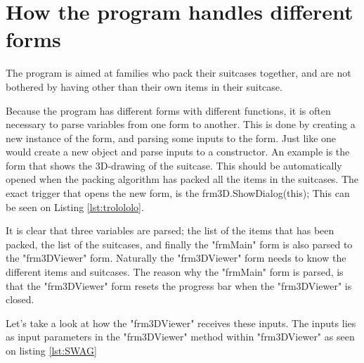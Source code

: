 \section{How the program handles different forms}
The program is aimed at families who pack their suitcases together, and are not bothered by having other than their own items in their suitcase. 

Because the program has different forms with different functions, it is often necessary to parse variables from one form to another. This is done by creating a new instance of the form, and parsing some inputs to the form. Just like one would create a new object and parse inputs to a constructor. An example is the form that shows the 3D-drawing of the suitcase. This should be automatically opened when the packing algorithm has packed all the items in the suitcases. The exact trigger that opens the new form, is the frm3D.ShowDialog(this); This can be seen on Listing \ref{lst:trolololo}. 


It is clear that three variables are parsed; the list of the items that has been packed, the list of the suitcases, and finally the "frmMain" form is also parsed to the "frm3DViewer" form. Naturally the "frm3DViewer" form needs to know the different items and suitcases. The reason why the "frmMain" form is parsed, is that the "frm3DViewer" form resets the progress bar when the "frm3DViewer" is closed. 

Let's take a look at how the "frm3DViewer" receives these inputs. The inputs lies as input parameters in the "frm3DViewer" method within "frm3DViewer" as seen on listing \ref{lst:SWAG}

